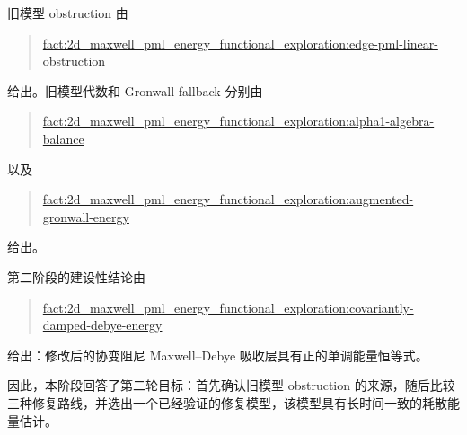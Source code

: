 \documentclass[UTF8,a4paper,12pt]{ctexart}
\begin{document}
旧模型 obstruction 由
\begin{quote}\small
\url{fact:2d_maxwell_pml_energy_functional_exploration:edge-pml-linear-obstruction}
\end{quote}
给出。旧模型代数和 Gronwall fallback 分别由
\begin{quote}\small
\url{fact:2d_maxwell_pml_energy_functional_exploration:alpha1-algebra-balance}
\end{quote}
以及
\begin{quote}\small
\url{fact:2d_maxwell_pml_energy_functional_exploration:augmented-gronwall-energy}
\end{quote}
给出。

第二阶段的建设性结论由
\begin{quote}\small
\url{fact:2d_maxwell_pml_energy_functional_exploration:covariantly-damped-debye-energy}
\end{quote}
给出：修改后的协变阻尼 Maxwell--Debye 吸收层具有正的单调能量恒等式。

因此，本阶段回答了第二轮目标：首先确认旧模型 obstruction 的来源，随后比较三种修复路线，并选出一个已经验证的修复模型，该模型具有长时间一致的耗散能量估计。
\end{document}

